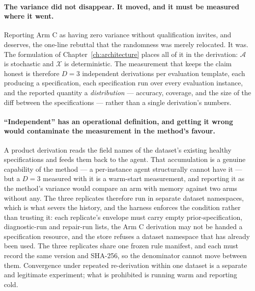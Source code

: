 \paragraph{The variance did not disappear. It moved, and it must be measured where it went.}
Reporting Arm C as having zero variance without qualification invites, and deserves, the
one-line rebuttal that the randomness was merely relocated. It was. The formulation of
Chapter~\ref{ch:architecture} places all of it in the derivation: $\mathcal{A}$ is stochastic
and $\mathcal{X}$ is deterministic. The measurement that keeps the claim honest is therefore
$D=3$ independent derivations per evaluation template, each producing a specification, each
specification run over every evaluation instance, and the reported quantity a
\emph{distribution} --- accuracy, coverage, and the size of the diff between the
specifications --- rather than a single derivation's numbers.

\paragraph{``Independent'' has an operational definition, and getting it wrong would
contaminate the measurement in the method's favour.}
A product derivation reads the field names of the dataset's existing healthy specifications and
feeds them back to the agent. That accumulation is a genuine capability of the method --- a
per-instance agent structurally cannot have it --- but a $D=3$ measured with it is a warm-start
measurement, and reporting it as the method's variance would compare an arm with memory against
two arms without any. The three replicates therefore run in separate dataset namespaces, which
is what severs the history, and the harness enforces the condition rather than trusting it: each
replicate's envelope must carry empty prior-specification, diagnostic-run and repair-run lists,
the Arm C derivation may not be handed a specification resource, and the store refuses a dataset
namespace that has already been used. The three replicates share one frozen rule manifest, and
each must record the same version and SHA-256, so the denominator cannot move between them.
Convergence under repeated re-derivation within one dataset is a separate and legitimate
experiment; what is prohibited is running warm and reporting cold.


